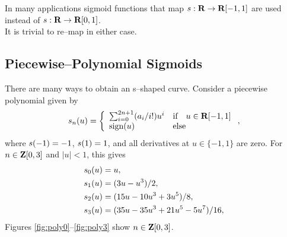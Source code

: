 \documentclass{article}
\begin{document}
    In many applications sigmoid functions that map $s:\textbf{R}\to\textbf{R}[-1,1]$ are used instead of $s:\textbf{R}\to\textbf{R}[0,1]$.\\
    It is trivial to re--map in either case.

    \clearpage

\subsection{Piecewise--Polynomial Sigmoids}


There are many ways to obtain an s--shaped curve.  Consider a piecewise polynomial given by
\begin{align*}
    s_n(u)=\left\{
        \begin{array}{lllllllllllllllllll}
            \sum_{i=0}^{2n+1} (a_i/i!)u^i & \text{if}\quad u\in\textbf{R}[-1,1]
            \\
            \text{sign}(u) & \text{else}
        \end{array}\right., 
\end{align*}
where $s (-1)=-1$, $s (1)=1$, and all derivatives at $u\in\{-1,1\}$ are zero.
For $n\in\textbf{Z}[0,3]$ and $|u|<1$, this gives
\begin{align*}
    s_0(u)&=u,\\
    s_1(u)&=(3 u - u^3)/2,\\
    s_2(u)&=(15 u - 10 u^3 + 3 u^5)/8,\\
    s_3(u)&=(35 u - 35 u^3 + 21 u^5 - 5 u^7)/16,
\end{align*}
Figures \ref{fig:poly0}--\ref{fig:poly3} show $n\in\textbf{Z}[0,3]$.\\
\end{document}

